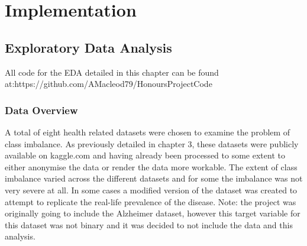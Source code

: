 \chapter{Implementation}\label{ch:Implementation}

\section{Exploratory Data Analysis}
All code for the EDA detailed in this chapter can be found at:\newline https://github.com/AMacleod79/HonoursProjectCode
\subsection{Data Overview}

A total of eight health related datasets were chosen to examine the problem of class imbalance. As previously detailed in chapter 3, these datasets were publicly available on kaggle.com and having already been processed to some extent to either anonymise the data or render the data more workable.\newline
The extent of class imbalance varied across the different datasets and for some the imbalance was not very severe at all. In some cases a modified version of the dataset was created to attempt to replicate the real-life prevalence of the disease.\newline
Note: the project was originally going to include the Alzheimer dataset, however this target variable for this dataset was not binary and it was decided to not include the data and this analysis.

